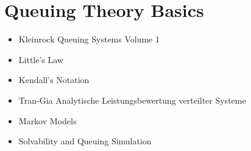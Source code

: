 \section{Queuing Theory Basics}

\begin{itemize}
\item Kleinrock Queuing Systems Volume 1 \cite{Kleinrock:1975:TVQ:1096491}
\item Little's Law
\item Kendall's Notation
\item Tran-Gia Analytische Leistungsbewertung verteilter Systeme \cite{trangia-lbvs}
\item Markov Models 
\item Solvability and Queuing Simulation

\end{itemize}



